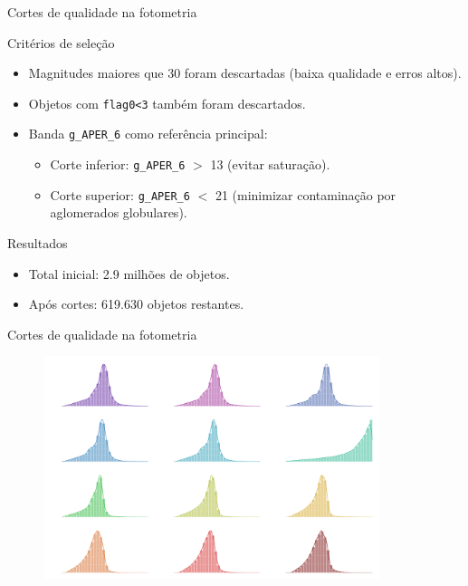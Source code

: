 \begin{frame}[c]{Cortes de qualidade na fotometria}
    \begin{splusbox}{Critérios de seleção}
        \begin{itemize}
            \item Magnitudes maiores que 30 foram descartadas (baixa qualidade e erros altos).
            \item Objetos com \texttt{flag0<3} também foram descartados.
            \item Banda \texttt{g\_APER\_6} como referência principal:
            \begin{itemize}
                \item Corte inferior: \texttt{g\_APER\_6} $>$ 13 (evitar saturação).
                \item Corte superior: \texttt{g\_APER\_6} $<$ 21 (minimizar contaminação por aglomerados globulares).
            \end{itemize}
        \end{itemize}
    \end{splusbox}

    \begin{splusbox}{Resultados}
        \begin{itemize}
            \item Total inicial: 2.9 milhões de objetos.
            \item Após cortes: 619.630 objetos restantes.
        \end{itemize}
    \end{splusbox}

\end{frame}

\begin{frame}[c]{Cortes de qualidade na fotometria}
    \begin{figure}
        \centering
            \includegraphics[width=\linewidth, height=6.5cm, keepaspectratio]{images/hist_distri_mags_data.png}
    \end{figure}
\end{frame}

